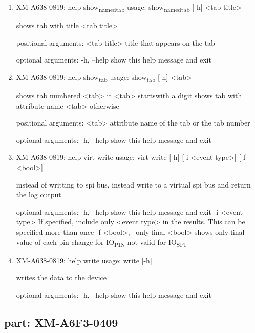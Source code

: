 \documentclass[11pt]{article}
\begin{document}
\begin{enumerate}
\item XM-A638-0819: help show\textsubscript{named}\textsubscript{tab}
\label{sec:org66cd387}
usage: show\textsubscript{named}\textsubscript{tab} [-h] <tab title>

shows tab with title <tab title>

positional arguments:
  <tab title>  title that appears on the tab

optional arguments:
  -h, --help   show this help message and exit

\item XM-A638-0819: help show\textsubscript{tab}
\label{sec:orgba500b5}
usage: show\textsubscript{tab} [-h] <tab>

shows tab numbered <tab> it <tab> startswith a digit shows tab with attribute
name <tab> otherwise

positional arguments:
  <tab>       attribute name of the tab or the tab number

optional arguments:
  -h, --help  show this help message and exit

\item XM-A638-0819: help virt-write
\label{sec:org8646a51}
usage: virt-write [-h] [-i <event type>] [-f <bool>]

instead of writting to spi bus, instead write to a virtual spi bus and return
the log output

optional arguments:
  -h, --help            show this help message and exit
  -i <event type>       If specified, include only <event type> in the
                        results. This can be specified more than once
  -f <bool>, --only-final <bool>
                        shows only final value of each pin change for IO\textsubscript{PIN}
                        not valid for IO\textsubscript{SPI}

\item XM-A638-0819: help write
\label{sec:org409d00c}
usage: write [-h]

writes the data to the device

optional arguments:
  -h, --help  show this help message and exit
\end{enumerate}

\subsection{part: XM-A6F3-0409}
\label{sec:org1849a01}
\end{document}
